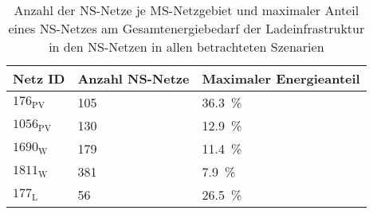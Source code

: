 {
\renewcommand{\arraystretch}{1.2}%
\begin{table}[H]
	\begin{center}
		\caption{Anzahl der NS-Netze je MS-Netzgebiet und maximaler Anteil eines NS-Netzes am Gesamtenergiebedarf der Ladeinfrastruktur in den NS-Netzen in allen betrachteten Szenarien}
		\begin{tabu} to 0.6\textwidth {X[0.5] X[1.1, r] X[1.5, r]}
			\toprule
			Netz ID    & Anzahl NS-Netze & Maximaler Energieanteil 			\\ \midrule
			\(176_{\text{PV}}\)  & \num{105}       & \SI{36.3}{\percent}              \\
			\(1056_{\text{PV}}\) & \num{130}       & \SI{12.9}{\percent}              \\
			\(1690_{\text{W}}\) & \num{179}       & \SI{11.4}{\percent}              \\
			\(1811_{\text{W}}\) & \num{381}       & \SI{7.9}{\percent}               \\
			\(177_{\text{L}}\)  & \num{56}        & \SI{26.5}{\percent}              \\ \bottomrule
		\end{tabu}
		\label{tab:largestLVGridShare}
	\end{center}
	\vspace{-3mm}%
\end{table}
}
